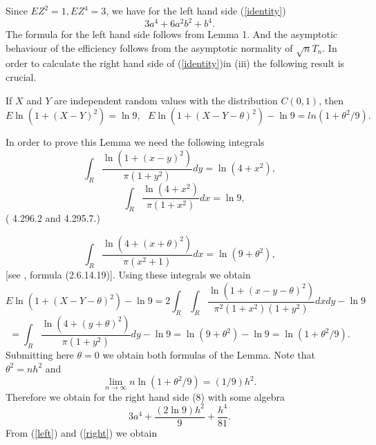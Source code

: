 \documentclass{svproc}
\begin{document}
Since $E Z^2=1, EZ^4=3$,  we have for the left hand side (\ref{identity})
\begin{equation}\label{left}
3a^4 + 6a^2b^2 + b^4.
 \end{equation}
 The formula for the left hand side follows from Lemma 1.
 And the asymptotic behaviour of the efficiency follows from the asymptotic normality of $\sqrt nT_n$.
In order to calculate the right hand side of  (\ref{identity})in (iii)
 the following result is crucial.
\begin{lemma}If $X$ and $Y$ are independent random values with the distribution
$C(0,1)$, then
\begin{equation}
 E \ln(1+ (X- Y)^2)= \ln 9,\,\,\,\,
 E \ln(1+ (X- Y - \theta)^2)-\ln 9
 =
ln(1+ \theta^2/9).
\end{equation}
\end{lemma}
In order to prove this Lemma we need the following integrals
\begin{equation}
\label{i1}
\int_{R}
\frac {\ln(1+(x-y)^2)}{\pi(1+y^2)} dy = \ln(4+x^2),
\end{equation}
\begin{equation}
\label{i2}
\quad \int_{R} \frac {\ln(4+x^2)}{\pi(1+x^2)} dx = \ln 9,
\end{equation}
(\cite{GradRyzh2007}  4.296.2 and 4.295.7.)

\begin{equation}
\label{i3}
\int_{R} \frac{\ln(4 +(x +\theta)^2 )}{\pi(x^2 +1)} dx = \ln(9+\theta^2),
\end{equation}
[see  \cite{PrudBrychMarich1981}, formula (2.6.14.19)].
Using these integrals we obtain
\begin{equation}
 E \ln(1+ (X- Y - \theta)^2)-\ln 9  = 2\int_{R} \int_{R} \frac{\ln(1+(x-y-\theta)^2)}{\pi^2(1+x^2)(1+y^2)} dx dy -\ln 9
\end{equation}
\begin{equation}
= \int_{R}\frac{\ln(4 +(y+\theta)^2)}{\pi(1+y^2)} dy- \ln 9= \ln(9+\theta^2) -\ln 9 = \ln(1+ \theta^2/9).
\end{equation}
Submitting here  $\theta=0$ we obtain both formulas of the Lemma.
Note that $\theta^2=nh^2$ and
$$
\lim_{n\to \infty} n \ln(1+ \theta^2/9)= (1/9)h^2.
$$
Therefore we obtain for the right hand side (8) with some algebra
\begin{equation}\label{right}
3a^4 + \frac{(2\ln 9 )h^2}{9} + \frac{h^4}{81}.
 \end{equation}
 From (\ref{left}) and  (\ref{right}) we obtain
\end{document}
